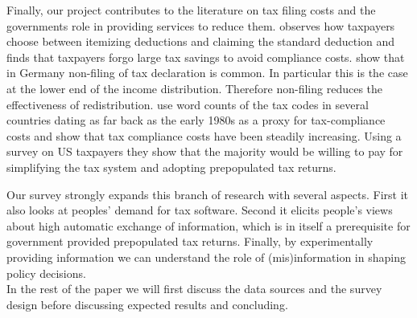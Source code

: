 \documentclass[11pt]{article}
\begin{document}
Finally, our project contributes to the literature on tax filing costs and the governments role in providing services to reduce them. \textcite{benzarti2020taxing} observes how taxpayers choose between itemizing deductions and claiming the standard deduction and finds that taxpayers forgo large tax savings to avoid compliance costs. \textcite{hauck2024optional} show that in Germany non-filing of tax declaration is common. In particular this is the case at the lower end of the income distribution. Therefore non-filing reduces the effectiveness of redistribution. \textcite{benzarti2024rising} use word counts of the tax codes in several countries dating as far back as the early 1980s as a proxy for tax-compliance costs and show that tax compliance costs have been steadily increasing. Using a survey on US taxpayers they show that the majority would be willing to pay for simplifying the tax system and adopting prepopulated tax returns. 

Our survey strongly expands this branch of research with several aspects. First it also looks at peoples' demand for tax software. Second it elicits people's views about high automatic exchange of information, which is in itself a prerequisite for government provided prepopulated tax returns. Finally, by experimentally providing information we can understand the role of (mis)information in shaping policy decisions.  \\[-0.5em] 

In the rest of the paper we will first discuss the data sources and the survey design before discussing expected results and concluding. 
\end{document}
